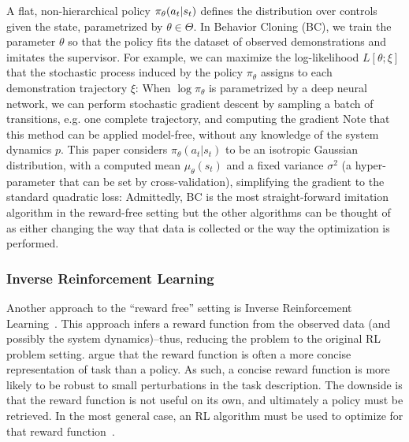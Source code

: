 A flat, non-hierarchical policy $\pi_\theta(a_t \vert s_t)$ defines the distribution over controls given the state, parametrized by $\theta\in\Theta$. In Behavior Cloning (BC), we train the parameter $\theta$ so that the policy fits the dataset of observed demonstrations and imitates the supervisor. For example, we can maximize the log-likelihood $L[\theta;\xi]$ that the stochastic process induced by the policy $\pi_\theta$ assigns to each demonstration trajectory $\xi$:
When $\log\pi_\theta$ is parametrized by a deep neural network, we can perform stochastic gradient descent by sampling a batch of transitions, e.g. one complete trajectory, and computing the gradient
Note that this method can be applied model-free, without any knowledge of the system dynamics $p$.
This paper considers $\pi_\theta(a_t|s_t)$ to be an isotropic Gaussian distribution, with a computed mean $\mu_\theta(s_t)$ and a fixed variance $\sigma^2$ (a hyper-parameter that can be set by cross-validation), simplifying the gradient to the standard quadratic loss:
Admittedly, BC is the most straight-forward imitation algorithm in the reward-free setting but the other algorithms can be thought of as either changing the way that data is collected or the way the optimization is performed.

\subsubsection{Inverse Reinforcement Learning}
Another approach to the ``reward free'' setting is Inverse Reinforcement Learning~\cite{abbeel2011inverse,ziebart2008maximum,ng2000algorithms}. This approach infers a reward function from the observed data (and possibly the system dynamics)--thus, reducing the problem to the original RL problem setting. \cite{abbeel2004apprenticeship} argue that the reward function is often a more concise representation of task than a policy. As such, a concise reward function is more likely to be robust to small perturbations in the task description. 
The downside is that the reward function is not useful on its own, and ultimately a policy must be retrieved. In the most general case, an RL algorithm must be used to optimize for that reward function~\cite{abbeel2004apprenticeship}.

